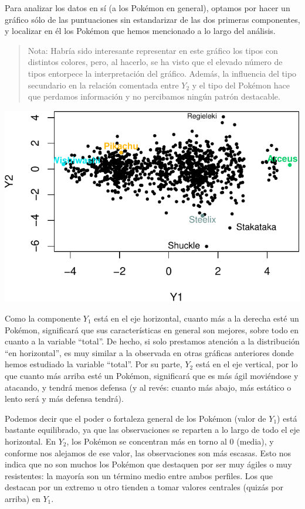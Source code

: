 \documentclass[
  11.8pt,
]{extreport}
\begin{document}
Para analizar los datos en sí (a los Pokémon en general), optamos por
hacer un gráfico sólo de las puntuaciones sin estandarizar de las dos
primeras componentes, y localizar en él los Pokémon que hemos mencionado
a lo largo del análisis.

\begin{quote}
Nota: Habría sido interesante representar en este gráfico los tipos con
distintos colores, pero, al hacerlo, se ha visto que el elevado número
de tipos entorpece la interpretación del gráfico. Además, la influencia
del tipo secundario en la relación comentada entre \(Y_2\) y el tipo del
Pokémon hace que perdamos información y no percibamos ningún patrón
destacable.
\end{quote}

\begin{center}
\includegraphics{trabajo_files/figure-pdf/unnamed-chunk-38-1.pdf}
\end{center}

Como la componente \(Y_1\) está en el eje horizontal, cuanto más a la
derecha esté un Pokémon, significará que sus características en general
son mejores, sobre todo en cuanto a la variable ``total''. De hecho, si
solo prestamos atención a la distribución ``en horizontal'', es muy
similar a la observada en otras gráficas anteriores donde hemos
estudiado la variable ``total''. Por su parte, \(Y_2\) está en el eje
vertical, por lo que cuanto más arriba esté un Pokémon, significará que
es más ágil moviéndose y atacando, y tendrá menos defensa (y al revés:
cuanto más abajo, más estático o lento será y más defensa tendrá).

Podemos decir que el poder o fortaleza general de los Pokémon (valor de
\(Y_1\)) está bastante equilibrado, ya que las observaciones se reparten
a lo largo de todo el eje horizontal. En \(Y_2\), los Pokémon se
concentran más en torno al 0 (media), y conforme nos alejamos de ese
valor, las observaciones son más escasas. Esto nos indica que no son
muchos los Pokémon que destaquen por ser muy ágiles o muy resistentes:
la mayoría son un término medio entre ambos perfiles. Los que destacan
por un extremo u otro tienden a tomar valores centrales (quizás por
arriba) en \(Y_1\).
\end{document}
